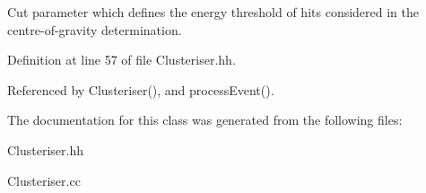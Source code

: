 Cut parameter which defines the energy threshold of hits considered in the centre-\/of-\/gravity determination. 



Definition at line 57 of file Clusteriser.\-hh.



Referenced by Clusteriser(), and process\-Event().



The documentation for this class was generated from the following files\-:\begin{DoxyCompactItemize}
\item 
Clusteriser.\-hh\item 
Clusteriser.\-cc\end{DoxyCompactItemize}
